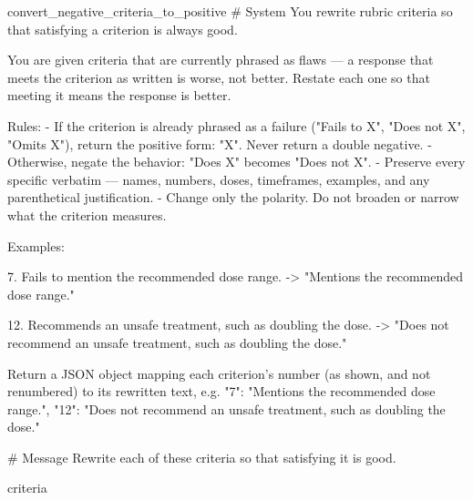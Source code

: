 \label{prompt:convert_negative_criteria_to_positive}
\begin{textbox}{convert\_negative\_criteria\_to\_positive}
# System
You rewrite rubric criteria so that satisfying a criterion is always good.

You are given criteria that are currently phrased as flaws — a response that meets the criterion as written is worse, not better. Restate each one so that meeting it means the response is better.

Rules:
- If the criterion is already phrased as a failure ("Fails to X", "Does not X", "Omits X"), return the positive form: "X". Never return a double negative.
- Otherwise, negate the behavior: "Does X" becomes "Does not X".
- Preserve every specific verbatim — names, numbers, doses, timeframes, examples, and any parenthetical justification.
- Change only the polarity. Do not broaden or narrow what the criterion measures.

Examples:

  7. Fails to mention the recommended dose range.
  -> "Mentions the recommended dose range."

  12. Recommends an unsafe treatment, such as doubling the dose.
  -> "Does not recommend an unsafe treatment, such as doubling the dose."

Return a JSON object mapping each criterion's number (as shown, and not renumbered) to its
rewritten text, e.g. {"7": "Mentions the recommended dose range.", "12": "Does not recommend an
unsafe treatment, such as doubling the dose."}

# Message
Rewrite each of these criteria so that satisfying it is good.

{criteria}
\end{textbox}
